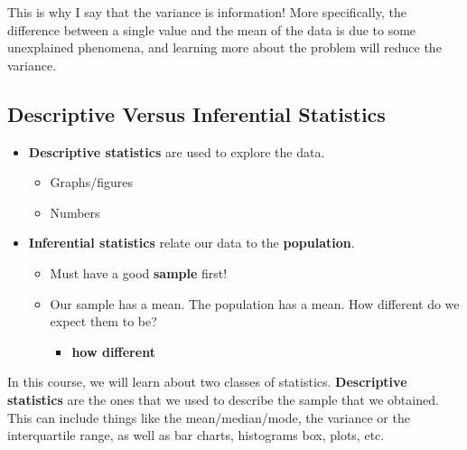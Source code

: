 \documentclass[
  letterpaper,
  DIV=11,
  numbers=noendperiod,
  oneside]{scrreprt}
\providecommand{\tightlist}{%
  \setlength{\itemsep}{0pt}\setlength{\parskip}{0pt}}\usepackage{longtable,booktabs,array}
\begin{document}
This is why I say that the variance is information! More specifically,
the difference between a single value and the mean of the data is due to
some unexplained phenomena, and learning more about the problem will
reduce the variance.

\hypertarget{descriptive-versus-inferential-statistics}{%
\subsection{Descriptive Versus Inferential
Statistics}\label{descriptive-versus-inferential-statistics}}

\begin{itemize}
\tightlist
\item
  \textbf{Descriptive statistics} are used to explore the data.

  \begin{itemize}
  \tightlist
  \item
    Graphs/figures
  \item
    Numbers
  \end{itemize}
\item
  \textbf{Inferential statistics} relate our data to the
  \textbf{population}.

  \begin{itemize}
  \tightlist
  \item
    Must have a good \textbf{sample} first!
  \item
    Our sample has a mean. The population has a mean. How different do
    we expect them to be?

    \begin{itemize}
    \tightlist
    \item
      \textbf{how different}
    \end{itemize}
  \end{itemize}
\end{itemize}

In this course, we will learn about two classes of statistics.
\textbf{Descriptive statistics} are the ones that we used to describe
the sample that we obtained. This can include things like the
mean/median/mode, the variance or the interquartile range, as well as
bar charts, histograms box, plots, etc.
{}
\end{document}
